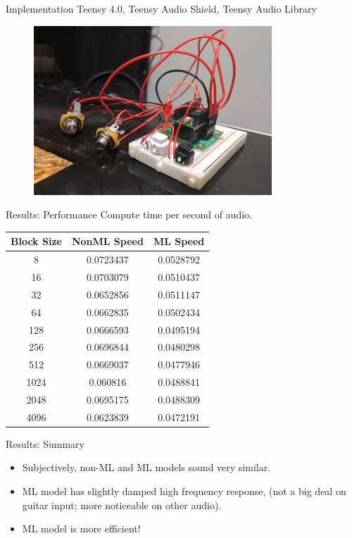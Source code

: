 \begin{frame}{Implementation}
    Teensy 4.0, Teensy Audio Shield, Teensy Audio Library
    \begin{figure}
        \centering
        \includegraphics[height=2.5in]{../Paper/Figures/Teensy.jpg}
    \end{figure}
\end{frame}

\begin{frame}{Results: Performance}
    Compute time per second of audio.
    \begin{table}[h!]
        \centering
         \begin{tabular}{||c | c | c||} 
         \hline
         Block Size & NonML Speed & ML Speed \\
         \hline\hline
         8    & 0.0723437 & 0.0528792 \\
         16   & 0.0703079 & 0.0510437 \\
         32   & 0.0652856 & 0.0511147 \\
         64   & 0.0662835 & 0.0502434 \\
         128  & 0.0666593 & 0.0495194 \\
         256  & 0.0696844 & 0.0480298 \\
         512  & 0.0669037 & 0.0477946 \\
         1024 & 0.060816  & 0.0488841 \\
         2048 & 0.0695175 & 0.0488309 \\
         4096 & 0.0623839 & 0.0472191 \\
         \hline
         \end{tabular}
    \end{table}
\end{frame}

\begin{frame}{Results: Summary}
    \begin{itemize}
        \item Subjectively, non-ML and ML models sound very similar.
        \item ML model has slightly damped high frequency response,
            (not a big deal on guitar input; more noticeable on other audio).
        \item ML model is more efficient!
    \end{itemize}
\end{frame}

\begin{frame}
\end{frame}
